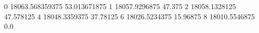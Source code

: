 0 18063.568359375 53.013671875
1 18057.9296875 47.375
2 18058.1328125 47.578125
4 18048.3359375 37.78125
6 18026.5234375 15.96875
8 18010.5546875 0.0
